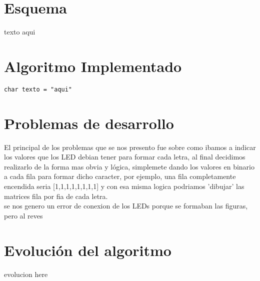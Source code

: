 \documentclass{article}
\begin{document}
\section{Esquema} \label{contenido}
texto aqui
\section{Algoritmo Implementado} \label{contenido}
\begin{lstlisting}
char texto = "aqui"
\end{lstlisting}

\section{Problemas de desarrollo} \label{conclulsion}
El principal de los problemas que se nos presento fue sobre como ibamos a indicar los valores que los LED debian tener para formar cada letra, al final decidimos realizarlo de la forma mas obvia y lógica, simplemete dando los valores en binario a cada fila para formar dicho caracter, por ejemplo, una fila completamente encendida seria [1,1,1,1,1,1,1,1] y con esa misma logica podriamos  'dibujar' las matrices fila por fia de cada letra. \\
se nos genero un error de conexion de los LEDs porque se formaban las figuras, pero al reves

\section{Evolución del algoritmo} \label{conclulsion}
evolucion here


\end{document}

